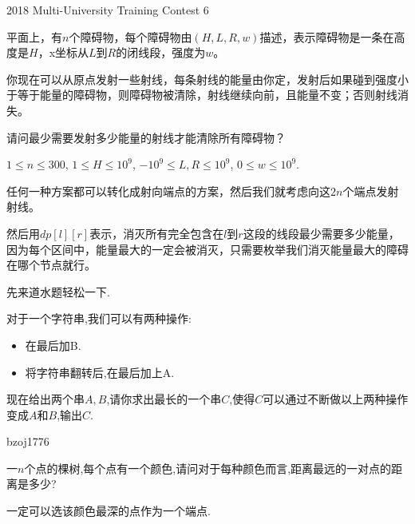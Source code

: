 \documentclass[11pt,serif]{beamer}
\begin{document}
	\begin{frame}{2018 Multi-University Training Contest 6}
		\begin{problem}
			平面上，有$n$个障碍物，每个障碍物由$(H,L,R,w)$描述，表示障碍物是一条在高度是$H$，x坐标从$L$到$R$的闭线段，强度为$w$。
			
			你现在可以从原点发射一些射线，每条射线的能量由你定，发射后如果碰到强度小于等于能量的障碍物，则障碍物被清除，射线继续向前，且能量不变；否则射线消失。
			
			请问最少需要发射多少能量的射线才能清除所有障碍物？
			
			$1 \leq n \leq 300$, $1 \leq H \leq 10^9$, $-10^9 \leq L, R \leq 10^9$, $0 \leq w \leq 10^9$.
		\end{problem}
	\end{frame}
	\begin{frame}
		\begin{solution}
			任何一种方案都可以转化成射向端点的方案，然后我们就考虑向这$2n$个端点发射射线。
			
			然后用$dp[l][r]$表示，消灭所有完全包含在$l$到$r$这段的线段最少需要多少能量，因为每个区间中，能量最大的一定会被消灭，只需要枚举我们消灭能量最大的障碍在哪个节点就行。
		\end{solution}
	\end{frame}

	\begin{frame}
		\begin{problem}
			先来道水题轻松一下.
			
			对于一个字符串,我们可以有两种操作:
			\begin{itemize}
				\item 在最后加B.
				\item 将字符串翻转后,在最后加上A.
			\end{itemize}
			现在给出两个串$A,B$,请你求出最长的一个串$C$,使得$C$可以通过不断做以上两种操作变成$A$和$B$,输出$C$.
		\end{problem} 
	\end{frame}

	\begin{frame}{bzoj1776}
		\begin{problem}
			一$n$个点的棵树,每个点有一个颜色,请问对于每种颜色而言,距离最远的一对点的距离是多少?
		\end{problem}	
	
		\pause 
		
		\begin{solution}
			一定可以选该颜色最深的点作为一个端点.
		\end{solution}
		
	\end{frame}
\end{document}
